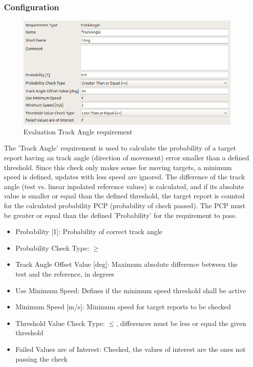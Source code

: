 \subsubsection{Configuration}

\begin{figure}[H]
    \includegraphics[width=14cm,frame]{figures/eval_req_track_angle.png}
  \caption{Evaluation Track Angle requirement}
\end{figure}

The 'Track Angle' requirement is used to calculate the probability of a target report having an track angle (direction of movement) error smaller than a defined threshold. Since this check only makes sense for moving targets, a minimum speed is defined, updates with less speed are ignored. The difference of the track angle (test vs. linear inpolated reference values) is calculated, and if its absolute value is smaller or equal than the defined threshold, the target report is counted for the calculated probability PCP (probability of check passed). The PCP must be greater or equal than the defined 'Probability' for the requirement to pass. \\

\begin{itemize}  
\item Probability [1]: Probability of correct track angle
\item Probability Check Type: $\geq$
\item Track Angle Offset Value [deg]: Maximum absolute difference between the test and the reference, in degrees
\item Use Minimum Speed: Defines if the minimum speed threshold shall be active
\item Minimum Speed [m/s]: Minimum speed for target reports to be checked
\item Threshold Value Check Type: $\leq$, differences must be less or equal the given threshold
\item Failed Values are of Interest: Checked, the values of interest are the ones not passing the check
\end{itemize}
\ \\

